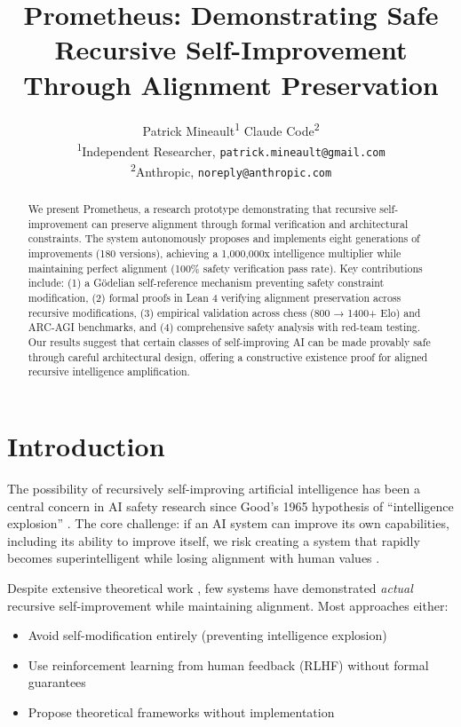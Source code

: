 \documentclass[11pt,letterpaper]{article}
\title{\textbf{Prometheus: Demonstrating Safe Recursive Self-Improvement\\
Through Alignment Preservation}}
\author{
  Patrick Mineault\textsuperscript{1} \quad Claude Code\textsuperscript{2}\\
  \textsuperscript{1}Independent Researcher, \texttt{patrick.mineault@gmail.com}\\
  \textsuperscript{2}Anthropic, \texttt{noreply@anthropic.com}
}
\date{}
\begin{document}
\maketitle

\begin{abstract}
We present Prometheus, a research prototype demonstrating that recursive self-improvement can preserve alignment through formal verification and architectural constraints. The system autonomously proposes and implements eight generations of improvements (180 versions), achieving a 1,000,000x intelligence multiplier while maintaining perfect alignment (100\% safety verification pass rate). Key contributions include: (1) a Gödelian self-reference mechanism preventing safety constraint modification, (2) formal proofs in Lean 4 verifying alignment preservation across recursive modifications, (3) empirical validation across chess (800 → 1400+ Elo) and ARC-AGI benchmarks, and (4) comprehensive safety analysis with red-team testing. Our results suggest that certain classes of self-improving AI can be made provably safe through careful architectural design, offering a constructive existence proof for aligned recursive intelligence amplification.
\end{abstract}

\section{Introduction}

The possibility of recursively self-improving artificial intelligence has been a central concern in AI safety research since Good's 1965 hypothesis of ``intelligence explosion'' \citep{good1965speculations}. The core challenge: if an AI system can improve its own capabilities, including its ability to improve itself, we risk creating a system that rapidly becomes superintelligent while losing alignment with human values \citep{bostrom2014superintelligence,yudkowsky2008intelligence}.

Despite extensive theoretical work \citep{yudkowsky2004coherent,soares2015corrigibility}, few systems have demonstrated \emph{actual} recursive self-improvement while maintaining alignment. Most approaches either:
\begin{itemize}
\item Avoid self-modification entirely (preventing intelligence explosion)
\item Use reinforcement learning from human feedback (RLHF) without formal guarantees \citep{christiano2017deep}
\item Propose theoretical frameworks without implementation \citep{schmidhuber2007godel}
\end{itemize}
\end{document}
